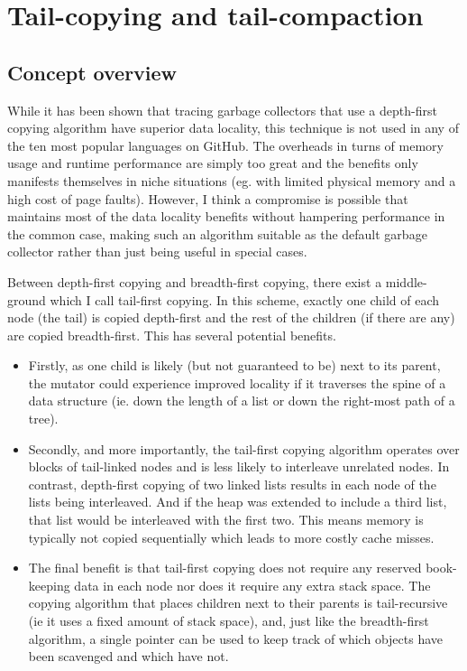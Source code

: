 \documentclass[a4paper,oneside]{memoir}
\begin{document}
\chapter{Tail-copying and tail-compaction}

\section{Concept overview}
\label{concept_overview}


While it has been shown that tracing garbage collectors that use a depth-first
copying algorithm have superior data locality, this technique is not used in any
of the ten most popular languages on GitHub. The overheads in turns of memory
usage and runtime performance are simply too great and the benefits only
manifests themselves in niche situations (eg. with limited physical memory and
a high cost of page faults). However, I think a compromise is possible that
maintains most of the data locality benefits without hampering performance in
the common case, making such an algorithm suitable as the default garbage
collector rather than just being useful in special cases.

Between depth-first copying and breadth-first copying, there exist a middle-ground
which I call tail-first copying. In this scheme, exactly one child of each node
(the tail) is copied depth-first and the rest of the children (if there are any)
are copied breadth-first. This has several potential benefits.
\begin{itemize}
  \item
  Firstly, as one
  child is likely (but not guaranteed to be) next to its parent, the mutator could
  experience improved locality if it traverses the spine of a data structure (ie.
  down the length of a list or down the right-most path of a tree).
  \item
  Secondly, and
  more importantly, the tail-first copying algorithm operates over blocks of
  tail-linked nodes and is less likely to interleave unrelated nodes. In contrast,
  depth-first copying of two linked lists results in each node of the lists being
  interleaved. And if the heap was extended to include a third list, that list
  would be interleaved with the first two. This means memory is typically not
  copied sequentially which leads to more costly cache misses.
  \item
  The final benefit
  is that tail-first copying does not require any reserved book-keeping data in
  each node nor does it require any extra stack space. The copying algorithm that
  places children next to their parents is tail-recursive (ie it uses a fixed
  amount of stack space), and, just like the breadth-first algorithm, a single
  pointer can be used to keep track of which objects have been scavenged and which
  have not.
\end{itemize}
\end{document}

